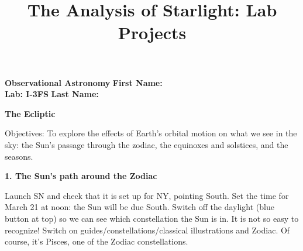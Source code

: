 \documentclass[12pt]{article}
\title{The Analysis of Starlight: Lab Projects}
\begin{document}
\setcounter{page}{1}
\setcounter{equation}{0}
\pagestyle{plain}
\thispagestyle{empty}  %
\newcommand{\kms}{\hbox{km\,s$^{\rm -1}$}}
\def\lo {\ifmmode {\,{\it L}\solar} \else $\,L$\solar\fi}       %
\def\my {\ifmmode {\,{\it M}\solar\,{\rm yr^{-1}}}              %
        \else {$\,M$\solar$\,$yr$^{\rm -1}$}\fi}
\def\BD {BD$\,$+30{\degr}3639}
\def\HUNO{\rm H$\,$I}                   %
\def\HDOS{\rm H$_2$}                    %
\def\arcsec{\ifmmode {^{\scriptscriptstyle\prime\prime}}
          \else $^{\scriptscriptstyle\prime\prime}$\fi}
\def\arcminm{\ifmmode {^{\scriptscriptstyle\prime}}
          \else $^{\scriptscriptstyle\prime}$\fi}
\def\deg{\ifmmode^\circ\else$^\circ$\fi}







\noindent
{\bf Observational Astronomy    \hfill} {\bf First Name:\makebox[4cm]{\hrulefill}}\\
{\bf Lab: I-3FS} \hfill {\bf Last Name:\makebox[4cm]{\hrulefill}}


\bigskip

\medskip

\noindent
{\hfill \Large {\bf The Ecliptic} \hfill}


\bigskip

\noindent
{Objectives:} To explore the effects of Earth's orbital motion on what
we see in the sky: the Sun's passage through the zodiac, the equinoxes
and solstices, and the seasons.

\medskip
\bigskip
\noindent
{\bf 1. The Sun's path around the Zodiac}

\medskip
\noindent
Launch SN and check that it is set up for NY, pointing South.  Set the
time for March 21 at noon: the Sun will be due South. Switch off the
daylight (blue button at top) so we can see which constellation the
Sun is in. It is not so easy to recognize! Switch on
guides/constellations/classical illustrations and Zodiac. Of course,
it's Pisces, one of the Zodiac constellations.
\end{document}
